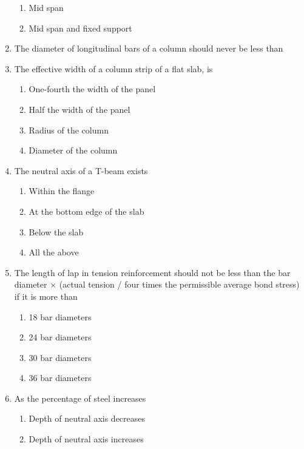 \documentclass[11pt,a4paper]{article}
\begin{document}
\begin{enumerate}
\begin{enumerate}[label=\Alph*.]
\item{Mid span}
\item{Mid span and fixed support}
\end{enumerate}
\item{The diameter of longitudinal bars of a column should never be less than}
\\\begin{enumerate*}[itemjoin=\qquad, label=\Alph*.]
\item{6 mm}
\item{8 mm}
\item{10 mm}
\item{12 mm}
\end{enumerate*}
\item{The effective width of a column strip of a flat slab, is}
\begin{enumerate}[label=\Alph*.]
\item{One-fourth the width of the panel}
\item{Half the width of the panel}
\item{Radius of the column}
\item{Diameter of the column}
\end{enumerate}
\item{The neutral axis of a T-beam exists}
\begin{enumerate}[label=\Alph*.]
\item{Within the flange}
\item{At the bottom edge of the slab}
\item{Below the slab}
\item{All the above}
\end{enumerate}
\item{The length of lap in tension reinforcement should not be less than the bar diameter $\times$ (actual tension / four times the permissible average bond stress) if it is more than
}
\begin{enumerate}[label=\Alph*.]
\item{18 bar diameters}
\item{24 bar diameters}
\item{30 bar diameters}
\item{36 bar diameters}
\end{enumerate}
\item{As the percentage of steel increases}
\begin{enumerate}[label=\Alph*.]
\item{Depth of neutral axis decreases}
\item{Depth of neutral axis increases}

\end{enumerate}
\end{enumerate}
\end{document}
